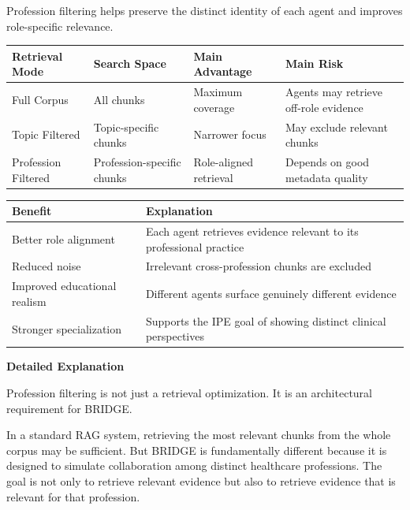 \documentclass[12pt]{article}
\begin{document}
Profession filtering helps preserve the distinct identity of each agent and improves role-specific relevance.

\begin{center}
\begin{tabular}{>{\raggedright\arraybackslash}p{1.4in} >{\raggedright\arraybackslash}p{1.6in} >{\raggedright\arraybackslash}p{1.6in} >{\raggedright\arraybackslash}p{1.6in}}
\toprule
\textbf{Retrieval Mode} & \textbf{Search Space} & \textbf{Main Advantage} & \textbf{Main Risk} \\
\midrule
Full Corpus & All chunks & Maximum coverage & Agents may retrieve off-role evidence \\
Topic Filtered & Topic-specific chunks & Narrower focus & May exclude relevant chunks \\
Profession Filtered & Profession-specific chunks & Role-aligned retrieval & Depends on good metadata quality \\
\bottomrule
\end{tabular}
\end{center}

\begin{center}
\begin{tabular}{>{\raggedright\arraybackslash}p{1.8in} >{\raggedright\arraybackslash}p{4.0in}}
\toprule
\textbf{Benefit} & \textbf{Explanation} \\
\midrule
Better role alignment & Each agent retrieves evidence relevant to its professional practice \\
Reduced noise & Irrelevant cross-profession chunks are excluded \\
Improved educational realism & Different agents surface genuinely different evidence \\
Stronger specialization & Supports the IPE goal of showing distinct clinical perspectives \\
\bottomrule
\end{tabular}
\end{center}

\textbf{Detailed Explanation}

Profession filtering is not just a retrieval optimization. It is an architectural requirement for BRIDGE.

In a standard RAG system, retrieving the most relevant chunks from the whole corpus may be sufficient. But BRIDGE is fundamentally different because it is designed to simulate collaboration among distinct healthcare professions. The goal is not only to retrieve relevant evidence but also to retrieve evidence that is relevant for that profession.
\end{document}
